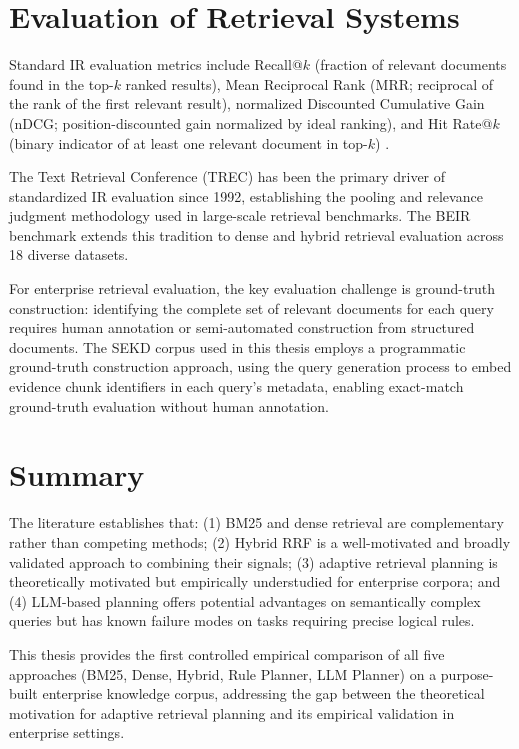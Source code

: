 \section{Evaluation of Retrieval Systems}
\label{sec:lit_eval}

Standard IR evaluation metrics include Recall@$k$ (fraction of relevant documents found in the top-$k$ ranked results), Mean Reciprocal Rank (MRR; reciprocal of the rank of the first relevant result), normalized Discounted Cumulative Gain (nDCG; position-discounted gain normalized by ideal ranking), and Hit Rate@$k$ (binary indicator of at least one relevant document in top-$k$) \citep{manning2008ir,jaervelin2002ndcg}.

The Text Retrieval Conference (TREC) \citep{voorhees2005trec} has been the primary driver of standardized IR evaluation since 1992, establishing the pooling and relevance judgment methodology used in large-scale retrieval benchmarks. The BEIR benchmark \citep{thakur2021beir} extends this tradition to dense and hybrid retrieval evaluation across 18 diverse datasets.

For enterprise retrieval evaluation, the key evaluation challenge is ground-truth construction: identifying the complete set of relevant documents for each query requires human annotation or semi-automated construction from structured documents. The SEKD corpus used in this thesis employs a programmatic ground-truth construction approach, using the query generation process to embed evidence chunk identifiers in each query's metadata, enabling exact-match ground-truth evaluation without human annotation.

\section{Summary}
\label{sec:lit_summary}

The literature establishes that: (1) BM25 and dense retrieval are complementary rather than competing methods; (2) Hybrid RRF is a well-motivated and broadly validated approach to combining their signals; (3) adaptive retrieval planning is theoretically motivated but empirically understudied for enterprise corpora; and (4) LLM-based planning offers potential advantages on semantically complex queries but has known failure modes on tasks requiring precise logical rules.

This thesis provides the first controlled empirical comparison of all five approaches (BM25, Dense, Hybrid, Rule Planner, LLM Planner) on a purpose-built enterprise knowledge corpus, addressing the gap between the theoretical motivation for adaptive retrieval planning and its empirical validation in enterprise settings.
